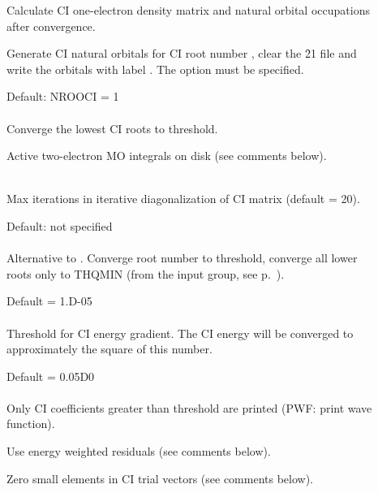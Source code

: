 \begin{description}
\item[]
  Calculate CI one-electron density matrix and natural
  orbital
  occupations after convergence.
 
\item[]
  Generate CI natural
  orbitals for CI root 
  number , 
  clear the \f{21} file and write the orbitals with label .
  The  option must be specified.
 
\item[]
  Default: NROOCI = 1\\
   \\
  Converge the lowest  CI roots to threshold.
 
\item[]
  Active two-electron MO integrals on disk (see comments below).
 
\item[]
   \\
  Max iterations in iterative diagonalization of CI matrix (default = 20).
 
\item[]
  Default: not specified\\
   \\
  Alternative to .  Converge root number 
  to threshold, converge all lower roots only to THQMIN
  (from the  input group, see
  p.~\pageref{ref-optinp}). 

\item[]
  Default = 1.D-05\\
   \\
  Threshold for CI energy gradient.  The CI energy will be converged to
  approximately the square of this number.
 
\item[]
  Default = 0.05D0\\
   \\
  Only CI coefficients greater than threshold are printed
  (PWF: print wave function).
 
\item[]
  Use energy weighted residuals (see comments below).
 
\item[]
  Zero small elements in CI trial vectors (see comments below).
\end{description}
 
